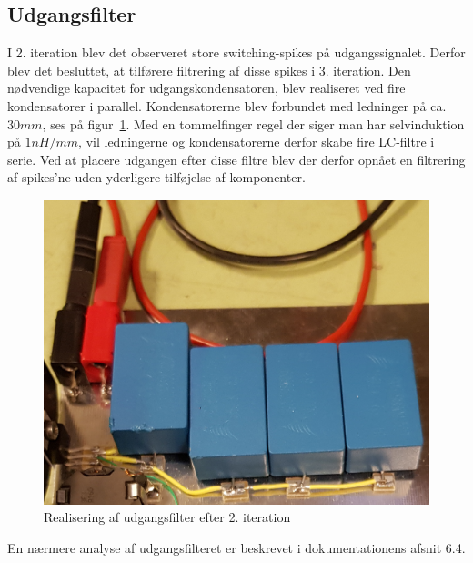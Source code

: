 
\subsection{Udgangsfilter}
I 2. iteration blev det observeret store switching-spikes på udgangssignalet. Derfor blev det besluttet, at tilførere filtrering af disse spikes i 3. iteration. Den nødvendige kapacitet for udgangskondensatoren, blev realiseret ved fire kondensatorer i parallel. Kondensatorerne blev forbundet med ledninger på ca. $30mm$, ses på figur~\ref{fig:udgangsfilter}. Med en tommelfinger regel der siger man har selvinduktion på $1nH/mm$\cite{rule_of_thumb}, vil ledningerne og kondensatorerne derfor skabe fire LC-filtre i serie. Ved at placere udgangen efter disse filtre blev der derfor opnået en filtrering af spikes'ne uden yderligere tilføjelse af komponenter. 

\begin{figure}[H]
	\centering
	\includegraphics[width=0.5\linewidth]{../Dokumentation/tex/3iteration/Billeder/Analyse/Udgangsfilter_2iteration.png}
	\caption{Realisering af udgangsfilter efter 2. iteration}
	\label{fig:udgangsfilter}
\end{figure}

\noindent En nærmere analyse af udgangsfilteret er beskrevet i dokumentationens afsnit 6.4.